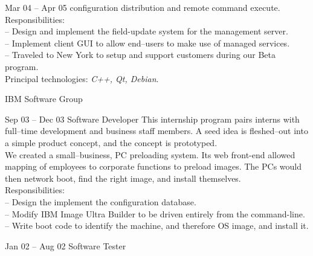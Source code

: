 \documentclass[a4paper, 10pt]{article}
\begin{document}
\begin{resume}
\begin{block}
\begin{subcategory}{Mar 04 -- Apr 05}
                configuration distribution and remote command execute.
                \\[1ex]
                Responsibilities: \\
                -- Design and implement the field-update system for the management server. \\
                -- Implement client GUI to allow end--users to make use of managed services. \\
                -- Traveled to New York to setup and support customers during our Beta program.
                \\[1ex]
                Principal technologies: \emph{C++, Qt, Debian}.
                \bigskip
                \bigskip
            \end{subcategory}
        \end{block}
        \begin{block}
            \begin{category}{IBM}
                 {Software Group}
                \smallskip
            \end{category}
            \begin{subcategory}{Sep 03 -- Dec 03}
                 {Software Developer}
                This internship program pairs interns with full--time development and
                business staff members.  A seed idea is fleshed--out into a simple
                product concept, and the concept is prototyped.
                \\[1ex]
                We created a small--business, PC preloading system.  Its web front-end allowed
                mapping of employees to corporate functions to preload images.  The PCs would
                then network boot, find the right image, and install themselves.
                \\[1ex]
                Responsibilities: \\
                -- Design the implement the configuration database. \\
                -- Modify IBM Image Ultra Builder to be driven entirely from the command-line. \\
                -- Write boot code to identify the machine, and therefore OS image, and install it.
                \bigskip
            \end{subcategory}
            \begin{subcategory}{Jan 02 -- Aug 02}
                 {Software Tester}

\end{subcategory}
\end{block}
\end{resume}
\end{document}
